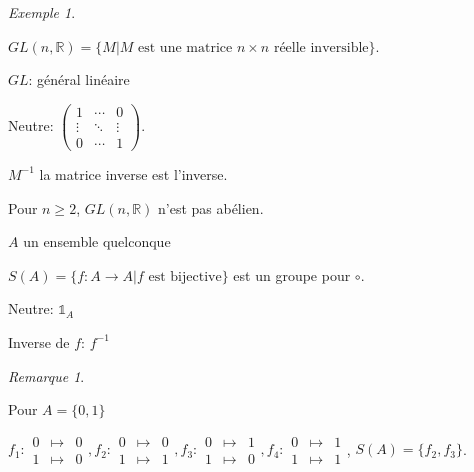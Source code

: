 \documentclass{report}
\newcommand*{\reels}{\mathbb{R}}
\theoremstyle{definition}
\theoremstyle{remark}
\newtheorem*{exem}{Exemple}
\newtheorem*{rema}{Remarque}
\begin{document}
\begin{exem}
\begin{nlist}[resume]
			$GL(n,\reels)=\{M|M \text{ est une matrice $n\times n$ r\'eelle inversible}\}$.

			$GL$: g\'en\'eral lin\'eaire

			Neutre: $\left( \begin{array}{ccc}
				1&\dotsb&0\\
				\vdots&\ddots&\vdots\\
				0&\dotsb&1
			\end{array} \right)$.

			$M^{-1}$ la matrice inverse est l'inverse.

			Pour $n \geq 2$, $GL(n,\reels)$  n'est pas ab\'elien.
			\item $A$ un ensemble quelconque

			$S(A)=\{f:A \to A|f \text{ est bijective}\}$ est un groupe pour $\circ$.

			Neutre: $\mathds{1}_A$

			Inverse de $f$: $f^{-1}$
		\end{nlist}
	\end{exem}
	\begin{rema}
		~

		Pour $A=\{0,1\}$

		$f_1:\begin{array}{rcl}
			0&\mapsto&0\\
			1&\mapsto&0
		\end{array},f_2:\begin{array}{rcl}
			0&\mapsto&0\\
			1&\mapsto&1
		\end{array},f_3:\begin{array}{rcl}
			0&\mapsto&1\\
			1&\mapsto&0
		\end{array},f_4:\begin{array}{rcl}
			0&\mapsto&1\\
			1&\mapsto&1
		\end{array}$, $S(A)=\{f_2,f_3\}$.
	\end{rema}
\end{document}
